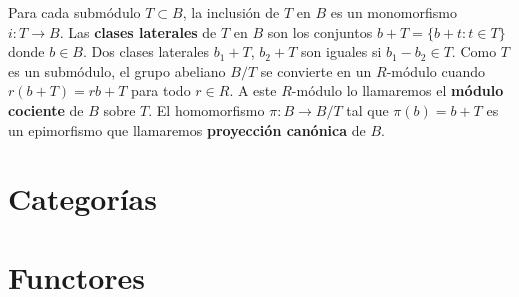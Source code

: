 Para cada submódulo $T \subset B$, la inclusión de $T$ en $B$ es un monomorfismo $i: T \rightarrow B$. Las \textbf{clases laterales} de $T$ en $B$ son los conjuntos $b + T = \{b + t : t \in T\}$ donde $b \in B$. Dos clases laterales $b_1 + T$, $b_2 + T$ son iguales si $b_1 - b_2 \in T$. Como $T$ es un submódulo, el grupo abeliano $B/T$ se convierte en un $R$-módulo cuando $r(b+T) = rb + T$ para todo $r \in R$. A este $R$-módulo lo llamaremos el \textbf{módulo cociente} de $B$ sobre $T$. El homomorfismo $\pi: B \rightarrow B/T$ tal que $\pi(b) = b + T$ es un epimorfismo que llamaremos \textbf{proyección canónica} de $B$.



\section{Categorías}

\section{Functores}




\endinput
